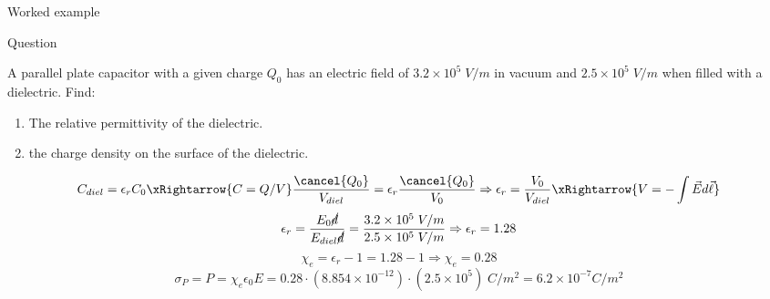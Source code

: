 
%
%

{
\problemslide


\begin{frame}{Worked example}

\begin{blockexmplque}{Question}

A parallel plate capacitor with a given charge $Q_0$ has an electric field of
$3.2 \times 10^5 \; V/m$ in vacuum and
$2.5 \times 10^5 \; V/m$ when filled with a dielectric.
Find:
\begin{enumerate}
   \item The relative permittivity of the dielectric.
   \item the charge density on the surface of the dielectric.
\end{enumerate}

\end{blockexmplque}

\begin{equation*}
  C_{diel} = \epsilon_r C_0 \xRightarrow{C=Q/V}
 \frac{\cancel{Q_0}}{V_{diel}} = \epsilon_r \frac{\cancel{Q_0}}{V_{0}} \Rightarrow
 \epsilon_r = \frac{V_{0}}{V_{diel}}  \xRightarrow{V = -\int \vec{E} d\vec{\ell}}
\end{equation*}
\begin{equation*}
  \epsilon_r = \frac{E_{0} \cancel{d}}{E_{diel}\cancel{d}} =
                       \frac{3.2 \times 10^5 \; V/m}{2.5 \times 10^5 \; V/m}
  \Rightarrow
  \epsilon_r = 1.28
\end{equation*}
\begin{equation*}
  \chi_e = \epsilon_r - 1 = 1.28 - 1 \Rightarrow \chi_e = 0.28
\end{equation*}
\begin{equation*}
  \sigma_P = P = \chi_e \epsilon_0 E =
      0.28 \cdot (8.854 \times 10^{-12}) \cdot (2.5 \times 10^5) \; C/m^2 = 6.2 \times 10^{-7} C/m^2
\end{equation*}


\end{frame}

} %


